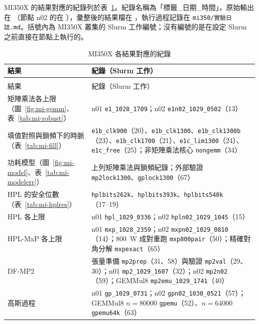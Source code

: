MI350X 的結果對應的紀錄列於表~\ref{tab:jobs-mi}。紀錄名稱為「標籤\_日期\_時間」，原始輸出在 （節點 n02 的在 ），彙整後的結果檔在 ，執行過程記錄在 \texttt{mi350/實驗日誌.md}。括號內為 MI350X 叢集的 Slurm 工作編號；沒有編號的是在設定 Slurm 之前直接在節點上執行的。

{\small\linespread{1.15}\selectfont\renewcommand{\arraystretch}{1.3}
\begin{longtable}{@{}>{\raggedright\arraybackslash}p{6.2cm}>{\raggedright\arraybackslash}p{\dimexpr\textwidth-6.2cm-2\tabcolsep\relax}@{}}
\caption{MI350X 各結果對應的紀錄}\label{tab:jobs-mi} \\
\toprule
結果 & 紀錄（Slurm 工作） \\
\midrule
\endfirsthead
\multicolumn{2}{@{}l}{\footnotesize 表~\ref{tab:jobs-mi}（續）} \\
\toprule
結果 & 紀錄（Slurm 工作） \\
\midrule
\endhead
\bottomrule
\endlastfoot
矩陣乘法各上限（圖~\ref{fig:mi-gemm}、表~\ref{tab:mi-robust}） & n01 \texttt{e1\_1028\_1709}；n02 \texttt{e1n02\_1029\_0502}（13） \\
填值對照與鎖頻下的時脈（表~\ref{tab:mi-fill}） & \texttt{e1b\_clk900}（20）、\texttt{e1b\_clk1300}、\texttt{e1b\_clk1300b}（23）、\texttt{e1b\_clk1700}（21）、\texttt{e1c\_lim1300}（24）、\texttt{e1c\_free}（25）；非矩陣乘法核心 \texttt{nongemm}（34） \\
功耗模型（圖~\ref{fig:mi-model}、表~\ref{tab:mi-modelerr}） & 上列矩陣乘法與鎖頻紀錄；外部驗證 \texttt{mp2lock1300}、\texttt{gplock1300}（67） \\
HPL 的安全位數（表~\ref{tab:mi-hplres}） & \texttt{hplbits262k}、\texttt{hplbits393k}、\texttt{hplbits540k}（17–19） \\
HPL 各上限 & n01 \texttt{hpl\_1029\_0336}；n02 \texttt{hpln02\_1029\_1045}（15） \\
HPL-MxP 各上限 & n01 \texttt{mxp\_1028\_2359}；n02 \texttt{mxpn02\_1029\_0810}（14）；800~W 成對重跑 \texttt{mxp800pair}（50）；精確對角分解 \texttt{mxpexact}（65） \\
DF-MP2 & 張量準備 \texttt{mp2prep}（31、58）與驗證 \texttt{mp2val}（29、30）；n01 \texttt{mp2\_1029\_1607}（32）；n02 \texttt{mp2n02}（59）；GEMMul8 \texttt{mp2emu\_1029\_1741}（40） \\
高斯過程 & n01 \texttt{gp\_1029\_0731}；n02 \texttt{gpn02\_1030\_0521}（57）；GEMMul8 $n=80000$ \texttt{gpemu}（52）、$n=64000$ \texttt{gpemu64k}（63） \\

\end{longtable}}
